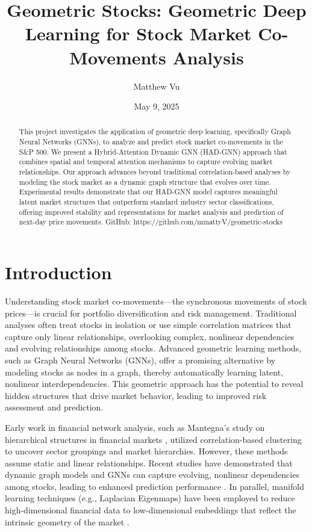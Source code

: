 \documentclass[12pt]{article}
\title{Geometric Stocks: Geometric Deep Learning for Stock Market Co-Movements Analysis}
\author{Matthew Vu}
\date{May 9, 2025}
\begin{document}
\maketitle

\begin{abstract}
This project investigates the application of geometric deep learning, specifically Graph Neural Networks (GNNs), to analyze and predict stock market co-movements in the S\&P 500. We present a Hybrid-Attention Dynamic GNN (HAD-GNN) approach that combines spatial and temporal attention mechanisms to capture evolving market relationships. Our approach advances beyond traditional correlation-based analyses by modeling the stock market as a dynamic graph structure that evolves over time. Experimental results demonstrate that our HAD-GNN model captures meaningful latent market structures that outperform standard industry sector classifications, offering improved stability and representations for market analysis and prediction of next-day price movements. GitHub: https://github.com/mmattyV/geometric-stocks
\end{abstract}

\section{Introduction}

Understanding stock market co-movements—the synchronous movements of stock prices—is crucial for portfolio diversification and risk management. Traditional analyses often treat stocks in isolation or use simple correlation matrices that capture only linear relationships, overlooking complex, nonlinear dependencies and evolving relationships among stocks. Advanced geometric learning methods, such as Graph Neural Networks (GNNs), offer a promising alternative by modeling stocks as nodes in a graph, thereby automatically learning latent, nonlinear interdependencies. This geometric approach has the potential to reveal hidden structures that drive market behavior, leading to improved risk assessment and prediction.

Early work in financial network analysis, such as Mantegna's study on hierarchical structures in financial markets \cite{mantegna1999}, utilized correlation-based clustering to uncover sector groupings and market hierarchies. However, these methods assume static and linear relationships. Recent studies have demonstrated that dynamic graph models and GNNs can capture evolving, nonlinear dependencies among stocks, leading to enhanced prediction performance \cite{kipf2017}. In parallel, manifold learning techniques (e.g., Laplacian Eigenmaps) have been employed to reduce high-dimensional financial data to low-dimensional embeddings that reflect the intrinsic geometry of the market \cite{belkin2003}.
\end{document}

